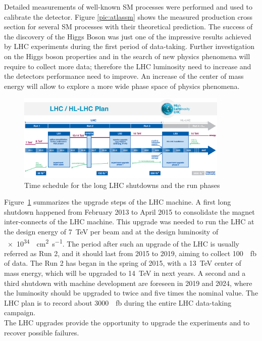 Detailed measurements of well-known SM processes were performed and used to calibrate the detector. Figure \ref{pic:atlassm} shows the measured production cross section for several SM processes with their theoretical prediction. 
The success of the discovery of the Higgs Boson was just one of the impressive results achieved by LHC experiments during the first period of data-taking. Further investigation on the Higgs boson properties and in the search of new physics phenomena will require to collect more data; therefore the LHC luminosity need to increase and the detectors performance need to improve. An increase of the center of mass energy will allow to explore a more wide phase space of physics phenomena.\\
\begin{figure}
\centering
\includegraphics[width=0.9\textwidth]{Images/atlas/LHC_upgrade_program.png}
\caption{Time schedule for the long LHC shutdowns and the run phases}
\label{pic:lhc_schedule}
\end{figure}
Figure~\ref{pic:lhc_schedule} summarizes the upgrade steps of the LHC machine. A first long shutdown happened from February 2013 to April 2015 to consolidate the magnet inter-connects of the LHC machine. This upgrade was needed to run the LHC at the design energy of \SI{7}{\TeV} per beam and at the design luminosity of \SI{e34}{\per\square\centi\meter\per\second}. The period after such an upgrade of the LHC is usually referred as Run 2, and it should last from 2015 to 2019, aiming to collect \SI{100}{\per\femto\barn} of data. The Run 2 has began in the spring of 2015, with a \SI{13}{\TeV} center of mass energy, which will be upgraded to \SI{14}{\TeV} in next years.
A second and a third shutdown with machine development are foreseen in 2019 and 2024, where the luminosity should be upgraded to twice and five times the nominal value.
The LHC plan is to record about \SI{3000}{\per\femto\barn} during the entire LHC data-taking campaign.\\
The LHC upgrades provide the opportunity to upgrade the experiments and to recover possible failures.
